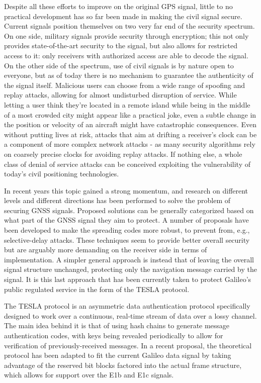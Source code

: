 Despite all these efforts to improve on the original GPS signal, little to no
practical development has so far been made in making the civil signal secure.
Current signals position themselves on two very far end of the security
spectrum. On one side, military signals provide security through encryption;
this not only provides state-of-the-art security to the signal, but also allows
for restricted access to it: only receivers with authorized access are able to
decode the signal. On the other side of the spectrum, use of civil signals is by
nature open to everyone, but as of today there is no mechanism to guarantee the
authenticity of the signal itself. Malicious users can choose from a wide range
of spoofing and replay attacks, allowing for almost undisturbed disruption of
service. While letting a user think they're located in a remote island while
being in the middle of a most crowded city might appear like a practical joke,
even a subtle change in the position or velocity of an aircraft might have
catastrophic consequences. Even without putting lives at risk, attacks that aim
at drifting a receiver's clock can be a component of more complex network
attacks - as many security algorithms rely on coarsely precise clocks for
avoiding replay attacks. If nothing else, a whole class of denial of service
attacks can be conceived exploiting the vulnerability of today's civil
positioning technologies.

In recent years this topic gained a strong momentum, and research on different
levels and different directions has been performed to solve the problem of
securing GNSS signals. Proposed solutions can be generally categorized based
on what part of the GNSS signal they aim to protect. A number of proposals have
been developed to make the spreading codes more robust, to prevent from, e.g.,
selective-delay attacks. These techniques seem to provide better overall
security but are arguably more demanding on the receiver side in terms of
implementation. A simpler general approach is instead that of leaving the
overall signal structure unchanged, protecting only the navigation message
carried by the signal. It is this last approach that has been currently taken to
protect Galileo's public regulated service in the form of the TESLA protocol.

The TESLA protocol is an asymmetric data authentication protocol specifically
designed to work over a continuous, real-time stream of data over a lossy
channel. The main idea behind it is that of using hash chains to generate
message authentication codes, with keys being revealed periodically to allow for
verification of previously-received messages. In a recent proposal, the
theoretical protocol has been adapted to fit the current Galileo data signal by
taking advantage of the reserved bit blocks factored into the actual frame
structure, which allows for support over the E1b and E1c signals. 


